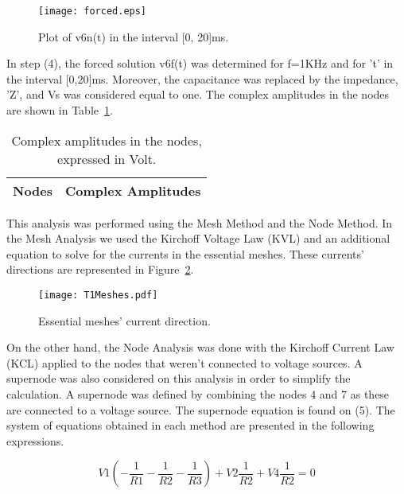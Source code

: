 \begin{figure}[h] \centering
\texttt{[image: forced.eps]}
\caption{Plot of v6n(t) in the interval [0, 20]ms.}
\label{fig:plotA(4)}
\end{figure}

In step (4), the forced solution v6f(t) was determined for f=1KHz and for 't' in the interval [0,20]ms. Moreover, the capacitance was replaced by the impedance, 'Z', and Vs was considered equal to one. The complex amplitudes in the nodes are shown in Table~\ref{tab:TA4}.

\begin{table}[h]
  \centering
  \begin{tabular}{|l|r|}
    \hline    
    {\bf Nodes} & {\bf Complex Amplitudes} \\ \hline
    
  \end{tabular}
  \caption{Complex amplitudes in the nodes, expressed in Volt.}
  \label{tab:TA4}
\end{table}













This analysis was performed using the Mesh Method and the Node Method. 
In the Mesh Analysis we used the Kirchoff Voltage Law (KVL) and an additional equation to solve for the currents in the essential meshes. These currents' directions are represented in Figure~\ref{fig:T1Meshes}.

\vspace{6.0cm}

\begin{figure}[h] \centering
\texttt{[image: T1Meshes.pdf]}
\caption{Essential meshes' current direction.}
\label{fig:T1Meshes}
\end{figure}

On the other hand, the Node Analysis was done with the Kirchoff Current Law (KCL) applied to the nodes that weren't connected to voltage sources. A supernode was also considered on this analysis in order to simplify the calculation. A supernode was defined by combining the nodes 4 and 7 as these are connected to a voltage source. The supernode equation is found on (5).
The system of equations obtained in each method are presented in the following expressions.

\begin{equation}
  V1(-\frac{1}{R1}-\frac{1}{R2}-\frac{1}{R3}) + V2\frac{1}{R2} + V4\frac{1}{R2} = 0
\end{equation}

